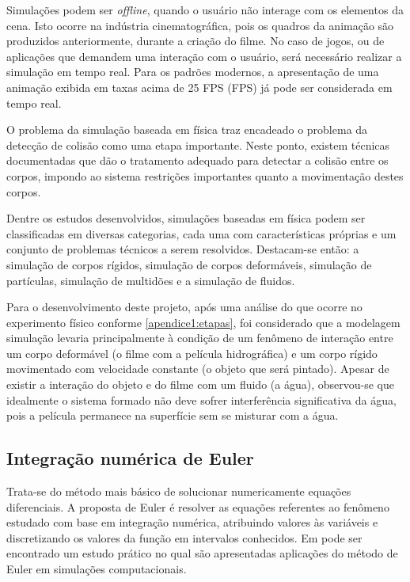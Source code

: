 Simulações podem ser \textit{offline}, quando o usuário não interage com os elementos da cena. Isto ocorre na indústria cinematográfica, pois os quadros da animação são produzidos anteriormente, durante a criação do filme. No caso de jogos, ou de aplicações que demandem uma interação com o usuário, será necessário realizar a simulação em tempo real. Para os padrões modernos, a apresentação de uma animação exibida em taxas acima de 25 \acs{FPS} (\acl{FPS}) já pode ser considerada em tempo real.

O problema da simulação baseada em física traz encadeado o problema da detecção de colisão como uma etapa importante. Neste ponto, existem técnicas documentadas que dão o tratamento adequado para detectar a colisão entre os corpos, impondo ao sistema restrições importantes quanto a movimentação destes corpos. \cite{moore1988collision} \cite{jimenez20013d}

Dentre os estudos desenvolvidos, simulações baseadas em física podem ser classificadas em diversas categorias, cada uma com características próprias e um conjunto de problemas técnicos a serem resolvidos. Destacam-se então: a simulação de corpos rígidos, simulação de corpos deformáveis, simulação de partículas, simulação de multidões e a simulação de fluidos. 

Para o desenvolvimento deste projeto, após uma análise do que ocorre no experimento físico conforme \ref{apendice1:etapas}, foi considerado que a modelagem simulação levaria principalmente à condição de um fenômeno de interação entre um corpo deformável (o filme com a película hidrográfica) e um corpo rígido movimentado com velocidade constante (o objeto que será pintado). Apesar de existir a interação do objeto e do filme com um fluido (a água), observou-se que idealmente o sistema formado não deve sofrer interferência significativa da água, pois a película permanece na superfície sem se misturar com a água.

\subsection{Integração numérica de Euler}

Trata-se do método mais básico de solucionar numericamente equações diferenciais. A proposta de Euler é resolver as equações referentes ao fenômeno estudado com base em integração numérica, atribuindo valores às variáveis e discretizando os valores da função em intervalos conhecidos. Em \cite{baraffphysically} pode ser encontrado um estudo prático no qual são apresentadas aplicações do método de Euler em simulações computacionais.

